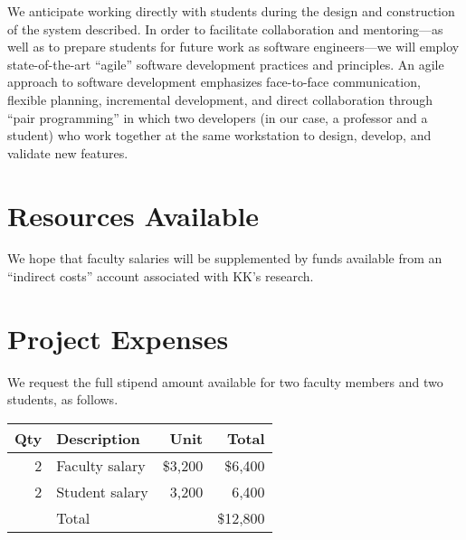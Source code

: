 \documentclass{article}
\begin{document}
We anticipate working directly with students
during the design and construction of the system described.
In order to facilitate collaboration and mentoring---as well as
to prepare students for future work
as software engineers---we will employ state-of-the-art
``agile'' software development
practices and principles.
An agile approach to software development emphasizes
face-to-face communication,
flexible planning,
incremental development,
and direct collaboration through ``pair programming'' in which two developers
(in our case, a professor and a student)
who work together at the same workstation
to design, develop, and validate new features.

\section{Resources Available}
\label{sec:resources-available}



We hope that faculty salaries will be supplemented
by funds available from
an ``indirect costs'' account associated with KK's research.

\section{Project Expenses}
\label{sec:project-expenses}



We request the full stipend amount available for
two faculty members
and two students, as follows.

\begin{center}
  \begin{tabular}{rlrr} \toprule
    Qty & Description    & Unit    & Total    \\ \midrule
    2   & Faculty salary & \$3,200 & \$6,400  \\
    2   & Student salary & 3,200   & 6,400    \\ \midrule
        & Total          &         & \$12,800 \\ \bottomrule
  \end{tabular}
\end{center}
\end{document}
